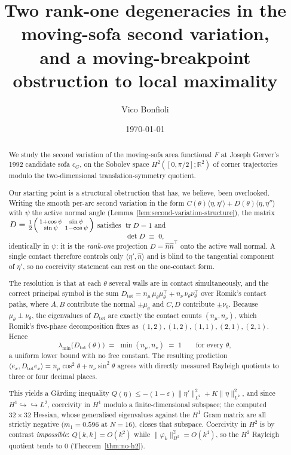 \documentclass[11pt]{amsart}
\title{Two rank-one degeneracies in the moving-sofa second variation,\\
       and a moving-breakpoint obstruction to local maximality}
\author{Vico Bonfioli}
\date{\today}
\theoremstyle{plain}
\theoremstyle{definition}
\newcommand{\R}{\mathbb{R}}
\newcommand{\cG}{c_{G}}
\begin{document}
\begin{abstract}
We study the second variation of the moving-sofa area functional $F$
at Joseph Gerver's 1992 candidate sofa $\cG$, on the Sobolev space
$H^{2}([0,\pi/2];\R^{2})$ of corner trajectories modulo the
two-dimensional translation-symmetry quotient.

Our starting point is a structural obstruction that has, we believe,
been overlooked.  Writing the smooth per-arc second variation in the
form $C(\theta)\langle\eta,\eta'\rangle + D(\theta)\langle\eta,
\eta''\rangle$ with $\psi$ the active normal angle
(Lemma~\ref{lem:second-variation-structure}), the matrix
$D = \tfrac12\begin{psmallmatrix}1+\cos\psi & \sin\psi\\ \sin\psi &
1-\cos\psi\end{psmallmatrix}$ satisfies $\operatorname{tr}D = 1$ and
\[
   \det D \;\equiv\; 0 ,
\]
identically in $\psi$: it is the \emph{rank-one} projection
$D = \hat n\hat n^{\top}$ onto the active wall normal.  A single
contact therefore controls only $\langle\eta',\hat n\rangle$ and is
blind to the tangential component of $\eta'$, so no coercivity
statement can rest on the one-contact form.

The resolution is that at each $\theta$ several walls are in contact
simultaneously, and the correct principal symbol is the sum
$D_{\mathrm{tot}} = n_{\mu}\,\mu_{\theta}\mu_{\theta}^{\top}
+ n_{\nu}\,\nu_{\theta}\nu_{\theta}^{\top}$
over Romik's contact paths, where $A,B$ contribute the normal
$\pm\mu_{\theta}$ and $C,D$ contribute $\pm\nu_{\theta}$.  Because
$\mu_{\theta}\perp\nu_{\theta}$, the eigenvalues of
$D_{\mathrm{tot}}$ are exactly the contact counts $(n_{\mu},n_{\nu})$,
which Romik's five-phase decomposition fixes as $(1,2),(1,2),(1,1),
(2,1),(2,1)$.  Hence
\[
   \lambda_{\min}\bigl(D_{\mathrm{tot}}(\theta)\bigr)
   \;=\; \min(n_{\mu},n_{\nu}) \;=\; 1
   \qquad\text{for every }\theta,
\]
a uniform lower bound with no free constant.  The resulting prediction
$\langle e_{x},D_{\mathrm{tot}}e_{x}\rangle = n_{\mu}\cos^{2}\theta
+ n_{\nu}\sin^{2}\theta$ agrees with directly measured Rayleigh
quotients to three or four decimal places.

This yields a G\aa rding inequality
$Q(\eta)\leq-(1-\varepsilon)\|\eta'\|^{2}_{L^{2}}+K\|\eta\|^{2}_{L^{2}}$,
and since $H^{1}\hookrightarrow\hookrightarrow L^{2}$, coercivity in
$H^{1}$ modulo a finite-dimensional subspace; the computed
$32\times32$ Hessian, whose generalised eigenvalues against the
$H^{1}$ Gram matrix are all strictly negative
($m_{1}=0.596$ at $N=16$), closes that subspace.  Coercivity in
$H^{2}$ is by contrast \emph{impossible}: $Q[k,k]=O(k^{2})$ while
$\|\varphi_{k}\|^{2}_{H^{2}}=O(k^{4})$, so the $H^{2}$ Rayleigh
quotient tends to $0$ (Theorem~\ref{thm:no-h2}).


\end{abstract}
\end{document}

